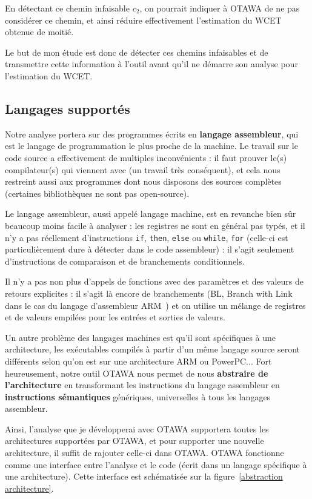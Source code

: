 \documentclass[french]{article}
\begin{document}
  En détectant ce chemin infaisable $c_2$, on pourrait indiquer à OTAWA de ne pas considérer ce chemin, et ainsi réduire effectivement l'estimation du WCET obtenue de moitié.

  Le but de mon étude est donc de détecter ces chemins infaisables et de transmettre cette information à l'outil avant qu'il ne démarre son analyse pour l'estimation du WCET.


  \subsection{Langages supportés}
  Notre analyse portera sur des programmes écrits en \textbf{langage assembleur}, qui est le langage de programmation le plus proche de la machine. Le travail sur le code source a effectivement de multiples inconvénients : il faut prouver le(s) compilateur(s) qui viennent avec (un travail très conséquent), et cela nous restreint aussi aux programmes dont nous disposons des sources complètes (certaines bibliothèques ne sont pas open-source).

  Le langage assembleur, aussi appelé langage machine, est en revanche bien sûr beaucoup moins facile à analyser : les registres ne sont en général pas typés, et il n'y a pas réellement d'instructions \texttt{if}, \texttt{then}, \texttt{else} ou \texttt{while}, \texttt{for} (celle-ci est particulièrement dure à détecter dans le code assembleur) : il s'agit seulement d'instructions de comparaison et de branchements conditionnels.

  Il n'y a pas non plus d'appels de fonctions avec des paramètres et des valeurs de retours explicites : il s'agit là encore de branchements (BL, Branch with Link dans le cas du langage d'assembleur ARM~\cite{ARM instruction set}) et on utilise un mélange de registres et de valeurs empilées pour les entrées et sorties de valeurs.

  Un autre problème des langages machines est qu'il sont spécifiques à une architecture, les exécutables compilés à partir d'un même langage source seront différents selon qu'on est sur une architecture ARM ou PowerPC... Fort heureusement, notre outil OTAWA nous permet de nous \textbf{abstraire de l'architecture} en transformant les instructions du langage assembleur en \textbf{instructions sémantiques} génériques, universelles à tous les langages assembleur.

  Ainsi, l'analyse que je développerai avec OTAWA supportera toutes les architectures supportées par OTAWA, et pour supporter une nouvelle architecture, il suffit de rajouter celle-ci dans OTAWA. OTAWA fonctionne comme une interface entre l'analyse et le code (écrit dans un langage spécifique à une architecture). Cette interface est schématisée sur la figure~\ref{abstraction architecture}.
\end{document}
